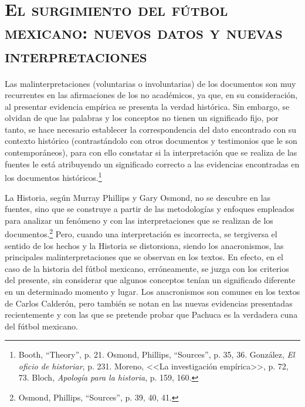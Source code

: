 \documentclass[11pt,a5paper,twoside]{book} %
\begin{document}
\section*{\mdseries\large\textsc{El surgimiento del fútbol mexicano: nuevos datos y nuevas interpretaciones}}

\noindent Las malinterpretaciones (voluntarias o involuntarias) de los documentos son muy recurrentes
en las afirmaciones de los no académicos, ya que, en su consideración, al presentar evidencia
empírica se presenta la verdad histórica. Sin embargo, se olvidan de que las palabras y los
conceptos no tienen un significado fijo, por tanto, se hace necesario establecer la
correspondencia del dato encontrado con su contexto histórico (contrastándolo con otros
documentos y testimonios que le son contemporáneos), para con ello constatar si la
interpretación que se realiza de las fuentes le está atribuyendo un significado correcto a las
evidencias encontradas en los documentos históricos.\footnote{Booth, ``Theory'', p. 21. Osmond, Phillips, ``Sources'', p. 35, 36. González, \emph{El oficio de historiar}, p. 231. Moreno, <<La investigación empírica>>, p. 72, 73. Bloch, \emph{Apología para la historia}, p. 159, 160.}

La Historia, según Murray Phillips y Gary Osmond, no se descubre en las fuentes,
sino que se construye a partir de las metodologías y enfoques empleados para analizar un
fenómeno y con las interpretaciones que se realizan de los documentos.\footnote{Osmond, Phillips, ``Sources'', p. 39, 40, 41.} Pero, cuando una
interpretación es incorrecta, se tergiversa el sentido de los hechos y la Historia se distorsiona,
siendo los anacronismos, las principales malinterpretaciones que se observan en los textos.
En efecto, en el caso de la historia del fútbol mexicano, erróneamente, se juzga con los
criterios del presente, sin considerar que algunos conceptos tenían un significado diferente
en un determinado momento y lugar. Los anacronismos son comunes en los textos de Carlos
Calderón, pero también se notan en las nuevas evidencias presentadas recientemente y con
las que se pretende probar que Pachuca es la verdadera cuna del fútbol mexicano.
\end{document}

